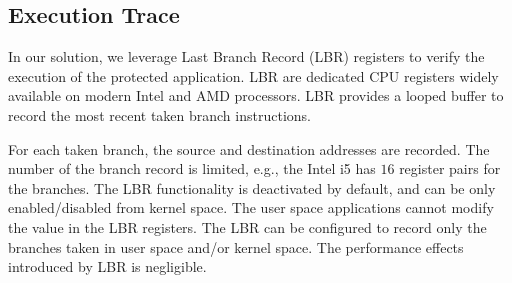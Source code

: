 \subsection{Execution Trace}

In our solution, we leverage Last Branch Record (LBR) registers to verify the execution of the protected application. LBR are dedicated CPU registers widely available on modern Intel and AMD processors. LBR provides a looped buffer to record the most recent taken branch instructions.

For each taken branch, the source and destination addresses are recorded. The number of the branch record is limited, e.g., the Intel i5 has $16$ register pairs for the branches. The LBR functionality is deactivated by default, and can be only enabled/disabled from kernel space. The user space applications cannot modify the value in the LBR registers. The LBR can be configured to record only the branches taken in user space and/or kernel space. The performance effects introduced by LBR is negligible.





